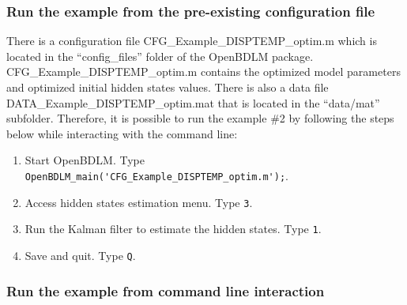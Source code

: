 \subsubsection{Run the example from the pre-existing configuration file}
\label{SS:LoadConfigFileEx2}
There is a configuration file CFG\_Example\_DISPTEMP\_optim.m which is located in the ``config\_files'' folder of the OpenBDLM package.
CFG\_Example\_DISPTEMP\_optim.m contains the optimized model parameters and optimized initial hidden states values.
There is also a data file DATA\_Example\_DISPTEMP\_optim.mat that is located in the ``data/mat'' subfolder.
Therefore, it is possible to run the example \#2 by following the steps below while interacting with the \MATLAB{} command line:
\begin{enumerate}
\item Start OpenBDLM. Type \colorbox{light-gray}{\lstinline[basicstyle = \mlttfamily \small, backgroundcolor = \color{light-gray}]!OpenBDLM_main('CFG_Example_DISPTEMP_optim.m');!}.
\item Access hidden states estimation menu. Type \colorbox{light-gray}{\lstinline[basicstyle = \mlttfamily \small, backgroundcolor = \color{light-gray}]!3!}.
\item Run the Kalman filter to estimate the hidden states. Type \colorbox{light-gray}{\lstinline[basicstyle = \mlttfamily \small, backgroundcolor = \color{light-gray}]!1!}.
\item Save and quit. Type \colorbox{light-gray}{\lstinline[basicstyle = \mlttfamily \small, backgroundcolor = \color{light-gray}]!Q!}.
\end{enumerate}


\subsubsection{Run the example from command line interaction}

